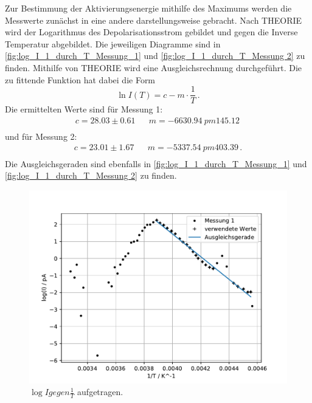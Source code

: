 Zur Bestimmung der Aktivierungsenergie mithilfe des Maximums werden die Messwerte zunächst in eine andere darstellungsweise gebracht.
Nach THEORIE wird der Logarithmus des Depolarisationsstrom gebildet und gegen die Inverse Temperatur abgebildet.
Die jeweiligen Diagramme sind in \autoref{fig:log_I_1_durch_T_Messung_1} und \autoref{fig:log_I_1_durch_T_Messung 2} zu finden.
Mithilfe von THEORIE wird eine Ausgleichsrechnung durchgeführt.
Die zu fittende Funktion hat dabei die Form
\begin{equation*}
  \ln{I(T)} = c - m \cdot \frac{1}{T} \, .
\end{equation*}
Die ermittelten Werte sind für Messung 1:
\begin{align*}
  c = 28.03 \pm  0.61 && m = -6630.94 \ pm 145.12  \,  \\
\end{align*}
und für Messung 2:
\begin{align*}
  c = 23.01 \pm  1.67 && m = -5337.54 \ pm 403.39  \, . \\
\end{align*}
Die Ausgleichsgeraden sind ebenfalls in \autoref{fig:log_I_1_durch_T_Messung_1} und \autoref{fig:log_I_1_durch_T_Messung 2} zu finden.

\begin{figure}
  \centering
  \includegraphics{build/log(I)_1durchT_1.pdf}
  \caption{$\log{I} gegen \frac{1}{T}$ aufgetragen.}
  \label{fig:log_I_1_durch_T_Messung_1}
\end{figure} %

